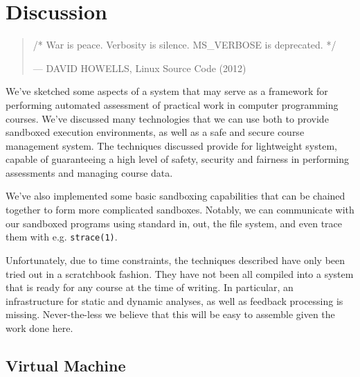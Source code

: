 
\chapter{Discussion}

\label{section:discussion}

\begin{quotation}

\footnotesize\sffamily\itshape

\begin{flushright}

/* War is peace. Verbosity is silence. MS\_VERBOSE is deprecated. */

\smallbreak

\upshape

--- DAVID HOWELLS, Linux Source Code (2012)

\end{flushright}

\end{quotation}

We've sketched some aspects of a system that may serve as a framework for
performing automated assessment of practical work in computer programming
courses. We've discussed many technologies that we can use both to provide
sandboxed execution environments, as well as a safe and secure course
management system. The techniques discussed provide for lightweight system,
capable of guaranteeing a high level of safety, security and fairness in
performing assessments and managing course data.

We've also implemented some basic sandboxing capabilities that can be chained
together to form more complicated sandboxes. Notably, we can communicate with
our sandboxed programs using standard in, out, the file system, and even trace
them with e.g. \texttt{strace(1)}.

Unfortunately, due to time constraints, the techniques described have only been
tried out in a scratchbook fashion. They have not been all compiled into a
system that is ready for any course at the time of writing. In particular, an
infrastructure for static and dynamic analyses, as well as feedback processing
is missing. Never-the-less we believe that this will be easy to assemble given
the work done here.

\section{Virtual Machine}

